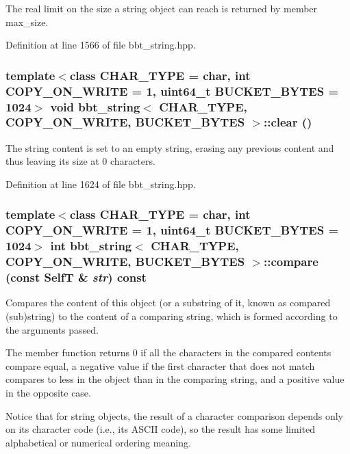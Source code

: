 The real limit on the size a string object can reach is returned by member max\_\-size. 

Definition at line 1566 of file bbt\_\-string.hpp.\hypertarget{classbbt__string_7cf658cb2b605dbc1c808e41f9e65b2d}{
\subsubsection[{clear}]{\setlength{\rightskip}{0pt plus 5cm}template$<$class CHAR\_\-TYPE  = char, int COPY\_\-ON\_\-WRITE = 1, uint64\_\-t BUCKET\_\-BYTES = 1024$>$ void {\bf bbt\_\-string}$<$ CHAR\_\-TYPE, COPY\_\-ON\_\-WRITE, BUCKET\_\-BYTES $>$::clear ()}}
\label{classbbt__string_7cf658cb2b605dbc1c808e41f9e65b2d}


The string content is set to an empty string, erasing any previous content and thus leaving its size at 0 characters. 

Definition at line 1624 of file bbt\_\-string.hpp.\hypertarget{classbbt__string_578af910a50c78cee9fe2466706585c1}{
\subsubsection[{compare}]{\setlength{\rightskip}{0pt plus 5cm}template$<$class CHAR\_\-TYPE  = char, int COPY\_\-ON\_\-WRITE = 1, uint64\_\-t BUCKET\_\-BYTES = 1024$>$ int {\bf bbt\_\-string}$<$ CHAR\_\-TYPE, COPY\_\-ON\_\-WRITE, BUCKET\_\-BYTES $>$::compare (const {\bf SelfT} \& {\em str}) const}}
\label{classbbt__string_578af910a50c78cee9fe2466706585c1}


Compares the content of this object (or a substring of it, known as compared (sub)string) to the content of a comparing string, which is formed according to the arguments passed.

The member function returns 0 if all the characters in the compared contents compare equal, a negative value if the first character that does not match compares to less in the object than in the comparing string, and a positive value in the opposite case.

Notice that for string objects, the result of a character comparison depends only on its character code (i.e., its ASCII code), so the result has some limited alphabetical or numerical ordering meaning.

